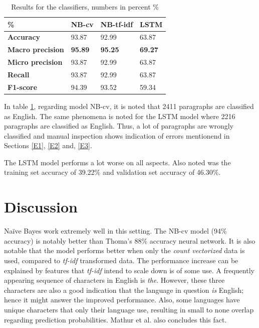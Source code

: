\documentclass[conference]{IEEEtran}
\begin{document}
\begin{table}[h]
  \caption{Results for the classifiers, numbers in percent \%}
  \label{tbl:results}
  \centering
  \begin{tabular}{l|l|l|l}
    \textbf{\%}              & \textbf{NB-cv} & \textbf{NB-tf-idf} & \textbf{LSTM}                       \\ \hline
    \textbf{Accuracy}        & 93.87          & 92.99              & \multicolumn{1}{l|}{63.87}          \\ \hline
    \textbf{Macro precision} & \textbf{95.89} & \textbf{95.25}     & \multicolumn{1}{l|}{\textbf{69.27}} \\ \hline
    \textbf{Micro precision} & 93.87          & 92.99              & \multicolumn{1}{l|}{63.87}          \\ \hline
    \textbf{Recall}          & 93.87          & 92.99              & \multicolumn{1}{l|}{63.87}          \\ \hline
    \textbf{F1-score}        & 94.39          & 93.52              & \multicolumn{1}{l|}{59.34}         
    \end{tabular}
\end{table}

In table \ref{tbl:results}, regarding model NB-cv, it is noted that 2411 paragraphs are classified as English. The same phenomena is noted for the LSTM model where 2216 paragraphs are classified as English. Thus, a lot of paragraphs are wrongly classified and manual inspection shows indication of errors mentionend in Sections \ref{E1}, \ref{E2} and, \ref{E3}. 

The LSTM model performs a lot worse on all aspects. Also noted was the training set accuracy of 39.22\% and validation set accuracy of 46.30\%.


\section{Discussion} \label{discussion}

Naïve Bayes work extremely well in this setting. The NB-cv model (94\% accuracy) is notably better than Thoma's 88\% accuracy neural network. It is also notable that the model performs better when only the \textit{count vectorized} data is used, compared to \textit{tf-idf} transformed data. The performance increase can be explained by features that \textit{tf-idf} intend to scale down is of some use. A frequently appearing sequence of characters in English is \textit{the}. However, these three characters are also a good indication that the language in question \textit{is} English; hence it might answer the improved performance. Also, some languages have unique characters that only their language use, resulting in small to none overlap regarding prediction probabilities. Mathur et al. \cite{lide} also concludes this fact.
\end{document}
